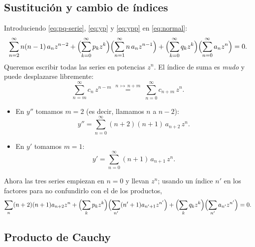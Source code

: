 \subsection{Sustitución y cambio de índices}\label{sec:indices}
Introduciendo \eqref{eq:pq-serie}, \eqref{eq:yp} y \eqref{eq:ypp} en
\eqref{eq:normal}:
\begin{equation}\label{eq:sustitucion}
  \sum_{n=2}^{\infty}n(n-1)\,a_n z^{n-2}
  +\Bigl(\sum_{k=0}^{\infty}p_k z^{k}\Bigr)\Bigl(\sum_{n=1}^{\infty}n\,a_n z^{n-1}\Bigr)
  +\Bigl(\sum_{k=0}^{\infty}q_k z^{k}\Bigr)\Bigl(\sum_{n=0}^{\infty}a_n z^{n}\Bigr)=0 .
\end{equation}
Queremos escribir todas las series en potencias $z^{n}$. El índice de
suma es \emph{mudo} y puede desplazarse libremente:
\begin{equation}\label{eq:desplazamiento}
  \sum_{n=m}^{\infty}c_n\,z^{n-m}
  \;\overset{n\,\mapsto\,n+m}{=}\;
  \sum_{n=0}^{\infty}c_{n+m}\,z^{n}.
\end{equation}
\begin{itemize}
  \item En $y''$ tomamos $m=2$ (es decir, llamamos $n$ a $n-2$):
        \begin{equation}\label{eq:ypp-desplazada}
          y''=\sum_{n=0}^{\infty}(n+2)(n+1)\,a_{n+2}\,z^{n}.
        \end{equation}
  \item En $y'$ tomamos $m=1$:
        \begin{equation}\label{eq:yp-desplazada}
          y'=\sum_{n=0}^{\infty}(n+1)\,a_{n+1}\,z^{n}.
        \end{equation}
\end{itemize}
Ahora las tres series empiezan en $n=0$ y llevan $z^{n}$; usando un índice
$n'$ en los factores para no confundirlo con el de los productos,
\begin{equation}\label{eq:sustitucion2}
  \sum_{n}(n+2)(n+1)a_{n+2}z^{n}
  +\Bigl(\sum_{k}p_k z^{k}\Bigr)\Bigl(\sum_{n'}(n'+1)a_{n'+1}z^{n'}\Bigr)
  +\Bigl(\sum_{k}q_k z^{k}\Bigr)\Bigl(\sum_{n'}a_{n'}z^{n'}\Bigr)=0 .
\end{equation}

\subsection{Producto de Cauchy}\label{sec:cauchy}

